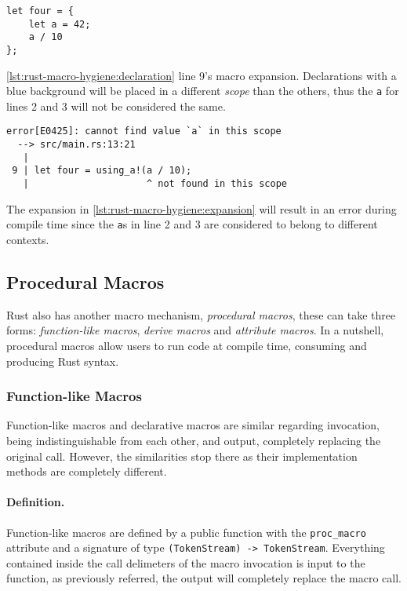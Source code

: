 \begin{listing}
    \begin{verbatim}
let four = {
    let a = 42;
    a / 10
};
    \end{verbatim}
    \caption{
        \autoref{lst:rust-macro-hygiene:declaration} line 9's macro expansion.
        Declarations with a blue background will be placed in a different \emph{scope} than the others,
        thus the \texttt{a} for lines 2 and 3 will not be considered the same.
    }
    \label{lst:rust-macro-hygiene:expansion}
\end{listing}

\begin{listing}
    \begin{verbatim}
error[E0425]: cannot find value `a` in this scope
  --> src/main.rs:13:21
   |
 9 | let four = using_a!(a / 10);
   |                     ^ not found in this scope
    \end{verbatim}
    \caption{
        The expansion in \autoref{lst:rust-macro-hygiene:expansion} will result in an error during compile time
        since the \texttt{a}s in line 2 and 3 are considered to belong to different contexts.
    }
    \label{lst:rust-macro-hygiene:error}
\end{listing}

\subsection{Procedural Macros}\label{sec:rust-macros:proc}
Rust also has another macro mechanism, \emph{procedural macros},
these can take three forms: \emph{function-like macros}, \emph{derive macros} and \emph{attribute macros}.
In a nutshell, procedural macros allow users to run code at compile time, consuming and producing Rust syntax.

\subsubsection*{Function-like Macros}
Function-like macros and declarative macros are similar regarding invocation, being indistinguishable from each other,
and output, completely replacing the original call.
However, the similarities stop there as their implementation methods are completely different.

\paragraph{Definition.}
Function-like macros are defined by a public function with the \texttt{proc\_macro} attribute and
a signature of type \texttt{(TokenStream) -> TokenStream}.
Everything contained inside the call delimeters of the macro invocation is input to the function,
as previously referred, the output will completely replace the macro call.

